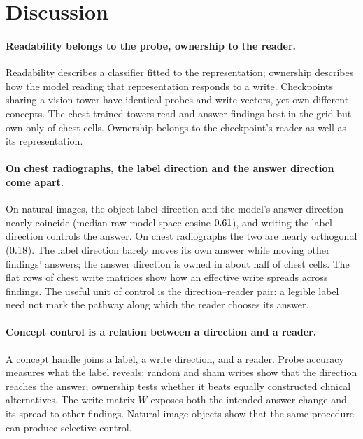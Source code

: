 \documentclass{article}
\begin{document}
\FloatBarrier
\section{Discussion}
\label{sec:implications}

\paragraph{Readability belongs to the probe, ownership to the reader.}
Readability describes a classifier fitted to the representation; ownership describes how the model reading that representation responds to a write. Checkpoints sharing a vision tower have identical probes and write vectors, yet own different concepts. The chest-trained towers read and answer findings best in the grid but own only \cfSpecTowerOwned{} of \cfSpecTowerN{} chest cells. Ownership belongs to the checkpoint's reader as well as its representation.

\paragraph{On chest radiographs, the label direction and the answer direction come apart.}
On natural images, the object-label direction and the model's answer direction nearly coincide (median raw model-space cosine $0.61$), and writing the label direction controls the answer. On chest radiographs the two are nearly orthogonal ($0.18$). The label direction barely moves its own answer while moving other findings' answers; the answer direction is owned in about half of chest cells. The flat rows of chest write matrices show how an effective write spreads across findings. The useful unit of control is the direction--reader pair: a legible label need not mark the pathway along which the reader chooses its answer.

\paragraph{Concept control is a relation between a direction and a reader.}
A concept handle joins a label, a write direction, and a reader. Probe accuracy measures what the label reveals; random and sham writes show that the direction reaches the answer; ownership tests whether it beats equally constructed clinical alternatives. The write matrix $W$ exposes both the intended answer change and its spread to other findings. Natural-image objects show that the same procedure can produce selective control.
\end{document}

